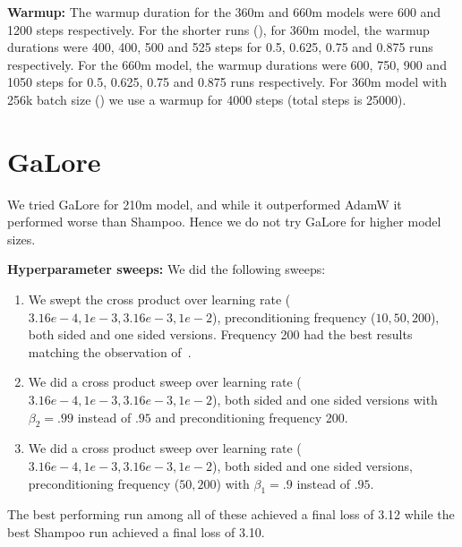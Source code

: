 \documentclass{article} %
\begin{document}
\textbf{Warmup:} The warmup duration for the 360m and 660m models were 600 and 1200 steps respectively. For the shorter runs (), for 360m model, the warmup durations were 400, 400, 500 and 525 steps for 0.5, 0.625, 0.75 and 0.875 runs respectively. For the 660m model, the warmup durations were 600, 750, 900 and 1050 steps for 0.5, 0.625, 0.75 and 0.875 runs respectively. For 360m model with 256k batch size () we use a warmup for 4000 steps (total steps is 25000).










































\section{GaLore}
\label{app:galore}

We tried GaLore for 210m model, and while it outperformed AdamW it performed worse than Shampoo. Hence we do not try GaLore for higher model sizes. 


\textbf{Hyperparameter sweeps:} We did the following sweeps:
\begin{enumerate}
    \item We swept the cross product over learning rate ($3.16e-4, 1e-3, 3.16e-3, 1e-2$), preconditioning frequency ($10, 50, 200$), both sided and one sided versions. Frequency 200 had the best results matching the observation of~\citet{galore}.
    \item We did a cross product sweep over learning rate ($3.16e-4, 1e-3, 3.16e-3, 1e-2$), both sided and one sided versions with $\beta_2 = .99$ instead of $.95$ and preconditioning frequency 200.
    \item We did a cross product sweep over learning rate ($3.16e-4, 1e-3, 3.16e-3, 1e-2$), both sided and one sided versions, preconditioning frequency ($50, 200$)  with $\beta_1 = .9$ instead of $.95$.
\end{enumerate}  


The best performing run among all of these achieved a final loss of 3.12 while the best Shampoo run achieved a final loss of 3.10. 
\end{document}
